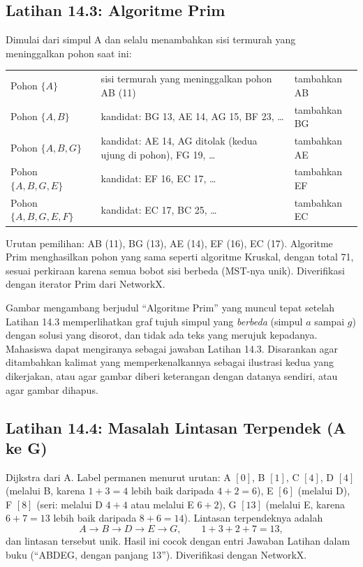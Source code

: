 \subsection*{Latihan 14.3: Algoritme Prim}

Dimulai dari simpul A dan selalu menambahkan sisi termurah yang meninggalkan pohon saat ini:
\begin{center}
\small
\begin{tabularx}{\linewidth}{@{}lXl@{}}
Pohon $\{A\}$ & sisi termurah yang meninggalkan pohon AB (11) & tambahkan AB \\
Pohon $\{A,B\}$ & kandidat: BG 13, AE 14, AG 15, BF 23, \dots & tambahkan BG \\
Pohon $\{A,B,G\}$ & kandidat: AE 14, AG ditolak (kedua ujung di pohon), FG 19, \dots & tambahkan AE \\
Pohon $\{A,B,G,E\}$ & kandidat: EF 16, EC 17, \dots & tambahkan EF \\
Pohon $\{A,B,G,E,F\}$ & kandidat: EC 17, BC 25, \dots & tambahkan EC \\
\end{tabularx}
\end{center}
Urutan pemilihan: AB (11), BG (13), AE (14), EF (16), EC (17). Algoritme Prim menghasilkan pohon yang sama seperti algoritme Kruskal, dengan total 71, sesuai perkiraan karena semua bobot sisi berbeda (MST-nya unik). Diverifikasi dengan iterator Prim dari NetworkX.

\begin{qaflag}
Gambar mengambang berjudul ``Algoritme Prim'' yang muncul tepat setelah Latihan 14.3 memperlihatkan graf tujuh simpul yang \emph{berbeda} (simpul $a$ sampai $g$) dengan solusi yang disorot, dan tidak ada teks yang merujuk kepadanya. Mahasiswa dapat mengiranya sebagai jawaban Latihan 14.3. Disarankan agar ditambahkan kalimat yang memperkenalkannya sebagai ilustrasi kedua yang dikerjakan, atau agar gambar diberi keterangan dengan datanya sendiri, atau agar gambar dihapus.
\end{qaflag}

\subsection*{Latihan 14.4: Masalah Lintasan Terpendek (A ke G)}

Dijkstra dari A. Label permanen menurut urutan: A $[0]$, B $[1]$, C $[4]$, D $[4]$ (melalui B, karena $1+3=4$ lebih baik daripada $4+2=6$), E $[6]$ (melalui D), F $[8]$ (seri: melalui D $4+4$ atau melalui E $6+2$), G $[13]$ (melalui E, karena $6+7=13$ lebih baik daripada $8+6=14$). Lintasan terpendeknya adalah
\[
A \to B \to D \to E \to G, \qquad 1 + 3 + 2 + 7 = 13,
\]
dan lintasan tersebut unik. Hasil ini cocok dengan entri Jawaban Latihan dalam buku (``ABDEG, dengan panjang 13''). Diverifikasi dengan NetworkX.

